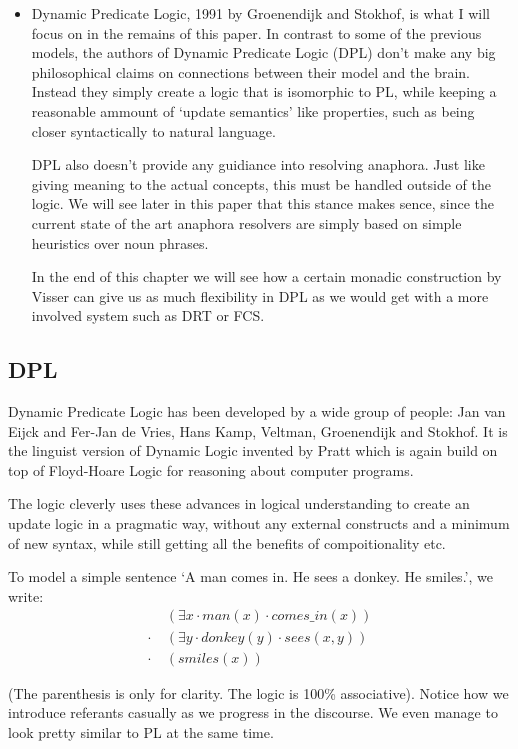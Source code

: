 \documentclass[12pt]{article}
\begin{document}
\begin{itemize}
\item Dynamic Predicate Logic, 1991 by Groenendijk and Stokhof\cite{groenendijk1991dynamic}, is what I will focus on in the remains of this paper. In contrast to some of the previous models, the authors of Dynamic Predicate Logic (DPL) don't make any big philosophical claims on connections between their model and the brain. Instead they simply create a logic that is isomorphic to PL, while keeping a reasonable ammount of `update semantics' like properties, such as being closer syntactically to natural language.

DPL also doesn't provide any guidiance into resolving anaphora. Just like giving meaning to the actual concepts, this must be handled outside of the logic. We will see later in this paper that this stance makes sence, since the current state of the art anaphora resolvers are simply based on simple heuristics over noun phrases.

In the end of this chapter we will see how a certain monadic construction by Visser can give us as much flexibility in DPL as we would get with a more involved system such as DRT or FCS.
\end{itemize}

\subsection{DPL}

Dynamic Predicate Logic has been developed by a wide group of people: Jan van Eijck and Fer-Jan de Vries\cite{eijck1992dynamic}, Hans Kamp, Veltman, Groenendijk and Stokhof. It is the linguist version of Dynamic Logic invented by Pratt\cite{pratt1976semantical} which is again build on top of Floyd-Hoare Logic for reasoning about computer programs.

The logic cleverly uses these advances in logical understanding to create an update logic in a pragmatic way, without any external constructs and a minimum of new syntax, while still getting all the benefits of compoitionality etc.

To model a simple sentence `A man comes in. He sees a donkey. He smiles.', we write:
%
\begin{align}
&(\exists x \cdot man(x) \cdot comes\_in(x)) \nonumber\\
\cdot\ &(\exists y \cdot donkey(y) \cdot sees(x,y)) \nonumber\\
\cdot\ &(smiles(x)) \nonumber
\end{align}

(The parenthesis is only for clarity. The logic is 100\% associative). Notice how we introduce referants casually as we progress in the discourse. We even manage to look pretty similar to PL at the same time. 
\end{document}
